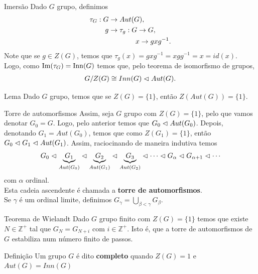 \begin{frame}{}
  \begin{block}{Imersão}
    Dado $G$ grupo, definimos
    \begin{align*}
      \tau_{G}:G&\to Aut(G),\\
               g&\to \tau_{g}:G\to G,\\
               \phantom{g}&\hspace{1.35cm} x\to gxg^{-1}.
    \end{align*}
    Note que se $g\in Z(G)$, temos que $\tau_g(x)=gxg^{-1}=xgg^{-1}=x=id(x)$.\\
    Logo, como $\operatorname{Im}(\tau_{G})=\operatorname{Inn}(G)$ temos que, pelo teorema de isomorfismo de grupos,
    \begin{align*}
      G/Z(G)\cong Inn(G)\vartriangleleft Aut(G).
    \end{align*}
  \end{block}
\end{frame}
\begin{frame}{}
  \begin{block}{Lema}
    Dado $G$ grupo, temos que se $Z(G)=\{1\}$, então $Z(Aut(G))=\{1\}$. 
  \end{block}
  \begin{block}{Torre de automorfismos}
    Assim, seja $G$ grupo com $Z(G)=\{1\}$, pelo que vamos denotar $G_0=G$. Logo, pelo anterior temos que $G_0\vartriangleleft Aut(G_0)$. Depois, denotando $G_1=Aut(G_0)$, temos que como $Z(G_1)=\{1\}$, então $G_0\vartriangleleft G_1\vartriangleleft Aut(G_1)$. Assim, raciocinando de maneira indutiva temos
    \begin{align*}
      G_0\vartriangleleft \underbrace{G_1}_{Aut(G_0)}\vartriangleleft \underbrace{G_2}_{Aut(G_1)}\vartriangleleft \underbrace{G_3}_{Aut(G_2)}\vartriangleleft\cdots\vartriangleleft G_{\alpha}\vartriangleleft G_{\alpha+1}\vartriangleleft\cdots
    \end{align*}
    com $\alpha$ ordinal.\\
    Esta cadeia ascendente é chamada a \textbf{torre de automorfismos}.\\
    Se $\gamma$ é um ordinal limite, definimos $G_{\gamma}=\bigcup_{\beta<\gamma}G_{\beta}$. 
  \end{block}
\end{frame}
\begin{frame}{}
  \begin{block}{Teorema de Wielandt}
    Dado $G$ grupo finito com $Z(G)=\{1\}$ temos que existe $N\in\mathbb{Z}^{+}$ tal que $G_{N}=G_{N+i}$ com $i\in\mathbb{Z}^{+}$. Isto é, que a torre de automorfismos de $G$ estabiliza num número finito de passos. 
  \end{block}
 \begin{block}{Definição}
Um grupo $G$ é dito \textbf{completo} quando $Z(G) = 1$ e $Aut(G) = Inn(G)$
\end{block}
\end{frame}
